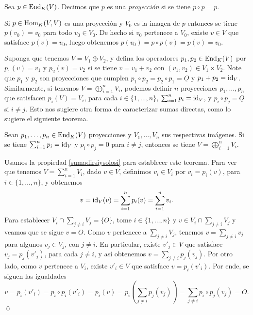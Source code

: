 \begin{defn}
Sea $p\in\operatorname{End}_K(V)$. Decimos que $p$ es una \emph{proyecci\'on} si se tiene $p\circ p=p$.
\end{defn}

\begin{obs}
Si $p\in\operatorname{Hom}_K(V,V)$ es una proyecci\'on y $V_0$ es la imagen de $p$ entonces se tiene $p(v_0)=v_0$ para todo $v_0\in V_0$. De hecho si $v_0$ pertenece a $V_0$, existe $v\in V$ que satisface $p(v)=v_0$, luego obtenemos $p(v_0)=p\circ p(v)=p(v)=v_0$.
\end{obs}

\begin{obs}
Suponga que tenemos $V=V_1\oplus V_2$, y defina los operadores $p_1,p_2\in\operatorname{End}_K(V)$ por $p_1(v)=v_1$ y $p_2(v)=v_2$ si se tiene $v=v_1+v_2$ con $(v_1,v_2)\in V_1\times V_2$. Note que $p_1$ y $p_2$ son proyecciones que cumplen $p_1\circ p_2=p_2\circ p_1=\underline{O}$ y $p_1+p_2=\operatorname{id}_V$. Similarmente, si tenemos $V=\bigoplus_{i=1}^{n}V_i$, podemos definir $n$ proyecciones $p_1,\ldots,p_n$ que satisfacen $p_i(V)=V_i$, para cada $i\in\{1,\ldots,n\}$, $\sum_{i=1}^n p_i=\operatorname{id}_V$, y $p_i\circ p_j=\underline{O}$ si $i\ne j$. Esto nos sugiere otra forma de caracterizar sumas directas, como lo sugiere el siguiente teorema.
\end{obs}

\begin{teo}\label{proysumadir}
Sean $p_1,\ldots,p_n\in\operatorname{End}_K(V)$ proyecciones y $V_1,\ldots,V_n$ sus respectivas im\'agenes. Si se tiene $\sum_{i=1}^n p_i=\operatorname{id}_V$ y $p_i\circ p_j=0$ para $i\ne j$, entonces se tiene $V=\bigoplus_{i=1}^n V_i$.
\end{teo}

\dem Usamos la propiedad \ref{sumadirsiysolosi} para establecer este teorema. Para ver que tenemos $V=\sum_{i=1}^nV_i$, dado $v\in V$, definimos $v_i\in V_i$ por $v_i=p_i(v)$, para $i\in\{1,\ldots,n\}$, y obtenemos
\[
v=\operatorname{id}_V(v)=\sum_{i=1}^n p_i(v)=\sum_{i=1}^n v_i.
\]
Para establecer $V_i\cap\sum_{j\ne i} V_j=\{O\}$, tome $i\in\{1,\ldots,n\}$ y $v\in V_i\cap\sum_{j\ne i} V_j$ y veamos que se sigue $v=O$. Como $v$ pertenece a $\sum_{j\ne i} V_j$, tenemos $v=\sum_{j\ne i} v_j$ para algunos $v_j\in V_j$, con $j\ne i$. En particular, existe $v'_j\in V$ que satisface $v_j=p_j(v'_j)$, para cada $j\ne i$, y as\'i obtenemos $v=\sum_{j\ne i} p_j(v_j)$. Por otro lado, como $v$ pertenece a $V_i$, existe $v'_i\in V$ que satisface $v=p_i(v'_i)$. Por ende, se siguen las igualdades
\[
v=p_i(v'_i)=p_i\circ p_i (v'_i)=p_i(v)=p_i\left(\sum_{j\ne i} p_j(v_j)\right)=\sum_{j\ne i} p_i\circ p_j(v_j)=O.
\]
\qed


